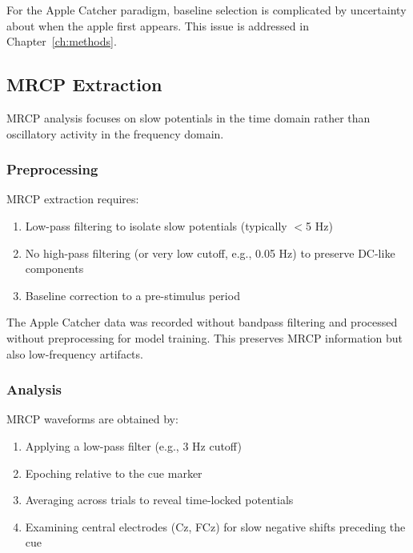 For the Apple Catcher paradigm, baseline selection is complicated by uncertainty about when the apple first appears. This issue is addressed in Chapter~\ref{ch:methods}.


\subsection{MRCP Extraction}
\label{subsec:bg_mrcp_methods}

MRCP analysis focuses on slow potentials in the time domain rather than oscillatory activity in the frequency domain.

\subsubsection{Preprocessing}

MRCP extraction requires:

\begin{enumerate}
    \item Low-pass filtering to isolate slow potentials (typically $<$5 Hz)
    \item No high-pass filtering (or very low cutoff, e.g., 0.05 Hz) to preserve DC-like components
    \item Baseline correction to a pre-stimulus period
\end{enumerate}

The Apple Catcher data was recorded without bandpass filtering and processed without preprocessing for model training. This preserves MRCP information but also low-frequency artifacts.

\subsubsection{Analysis}

MRCP waveforms are obtained by:

\begin{enumerate}
    \item Applying a low-pass filter (e.g., 3 Hz cutoff)
    \item Epoching relative to the cue marker
    \item Averaging across trials to reveal time-locked potentials
    \item Examining central electrodes (Cz, FCz) for slow negative shifts preceding the cue
\end{enumerate}


